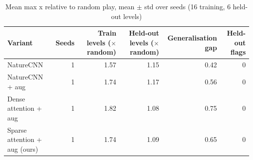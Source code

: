 \begin{table}[t]
\centering
\caption{Mean max x relative to random play, mean $\pm$ std over seeds (16 training, 6 held-out levels)}
\label{tab:generalization_summary}
\begin{tabular}{lrrrrr}
\toprule
Variant & Seeds & Train levels ($\times$ random) & Held-out levels ($\times$ random) & Generalisation gap & Held-out flags \\
\midrule
NatureCNN & 1 & 1.57 & 1.15 & 0.42 & 0 \\
NatureCNN + aug & 1 & 1.74 & 1.17 & 0.56 & 0 \\
Dense attention + aug & 1 & 1.82 & 1.08 & 0.75 & 0 \\
Sparse attention + aug (ours) & 1 & 1.74 & 1.09 & 0.65 & 0 \\
\bottomrule
\end{tabular}
\end{table}
